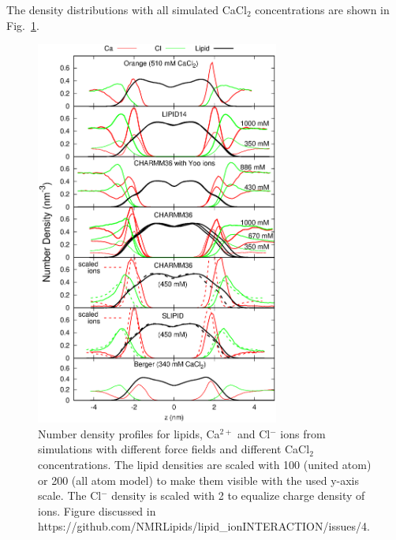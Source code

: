 \documentclass[pre,aps,floatfix,authordate1-4,twocolumn]{revtex4-1}
\begin{document}
The density distributions with all simulated CaCl$_2$ concentrations are shown in Fig.~\ref{CAdensities}.
\begin{figure}[]
  \centering
  \includegraphics[width=8cm]{../Fig/CAdensities.eps}
  \caption{\label{CAdensities}
    Number density profiles for lipids, Ca$^{2+}$ and Cl$^-$ ions from simulations with different force fields 
    and different CaCl$_2$ concentrations. 
    The lipid densities are scaled with 100 (united atom) or 200 (all atom model) to make them visible with the used y-axis scale.
    The Cl$^-$ density is scaled with 2 to equalize charge density of ions.
    Figure discussed in https://github.com/NMRLipids/lipid\_ionINTERACTION/issues/4.
  }
\end{figure}
\end{document}
